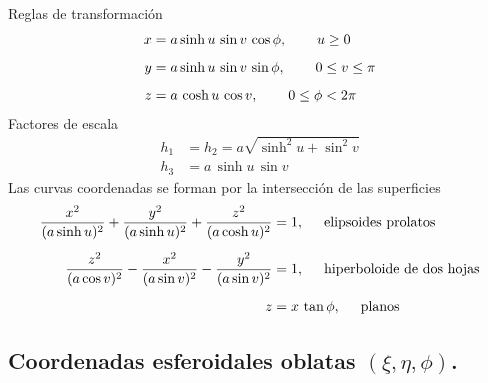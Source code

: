 \documentclass[hidelinks,12pt]{article}
\begin{document}
Reglas de transformación
\begin{align*}
    x &= a \sinh u \, \sin v \, \cos \phi, \hspace{0.75cm} u \geq 0 \\[0.5em]
    y &= a \sinh u \, \sin v \, \sin \phi, \hspace{0.75cm} 0 \leq v \leq \pi \\[0.5em]
    z &= a \, \cosh u \, \cos v, \hspace{0.75cm} 0 \leq \phi < 2 \pi
\end{align*}
Factores de escala
\begin{align*}
    h_{1} &= h_{2} = a \sqrt{\sinh^{2} u + \sin^{2} v} \\
    h_{3} &= a \, \sinh u \, \sin v
\end{align*}
Las curvas coordenadas se forman por la intersección de las superficies
\begin{align*}
    \dfrac{x^{2}}{(a \sinh u)^{2}} + \dfrac{y^{2}}{(a \sinh u)^{2}} + \dfrac{z^{2}}{(a \cosh u)^{2}}  &= 1, \hspace{0.5cm} \text{elipsoides prolatos} \\[0.5em]
    \dfrac{z^{2}}{(a \cos v)^{2}} - \dfrac{x^{2}}{(a \sin v)^{2}} - \dfrac{y^{2}}{(a \sin v)^{2}} &= 1, \hspace{0.5cm} \text{hiperboloide de dos hojas} \\[0.5em]
    z &= x \, \tan \phi, \hspace{0.5cm} \text{planos}
\end{align*}

\subsection{Coordenadas esferoidales oblatas \texorpdfstring{$(\xi, \eta, \phi)$}{(x, n, f)}.}
\end{document}
